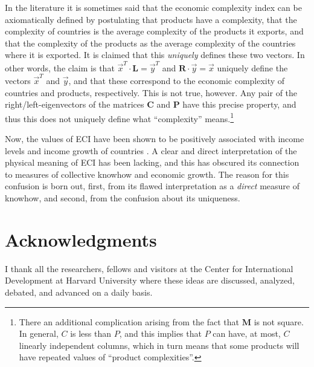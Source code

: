 \documentclass[12pt]{article}
\newcommand{\mtx}[1]{\mathbf{ #1}}
\begin{document}
In the literature it is sometimes said that the economic complexity index can be axiomatically defined by postulating that products have a complexity, that the complexity of countries is the average complexity of the products it exports, and that the complexity of the products as the average complexity of the countries where it is exported. It is claimed that this \emph{uniquely} defines these two vectors. In other words, the claim is that $\vec{x}^T\cdot\mtx{L}=\vec{y}^T$ and $\mtx{R}\cdot\vec{y}=\vec{x}$ uniquely define the vectors $\vec{x}^T$ and $\vec{y}$, and that these correspond to the economic complexity of countries and products, respectively. This is not true, however. Any pair of the right/left-eigenvectors of the matrices $\mtx{C}$ and $\mtx{P}$ have this precise property, and thus this does not uniquely define what ``complexity'' means.\footnote{There an additional complication arising from the fact that $\mtx{M}$ is not square. In general, $C$ is less than $P$, and this implies that $P$ can have, at most, $C$ linearly independent columns, which in turn means that some products will have repeated values of ``product complexities''.} 

Now, the values of ECI have been shown to be positively associated with income levels and income growth of countries \citep{HidalgoHausmann2009}. A clear and direct interpretation of the physical meaning of ECI has been lacking, and this has obscured its connection to measures of collective knowhow and economic growth. The reason for this confusion is born out, first, from its flawed interpretation as a \emph{direct} measure of knowhow, and second, from the confusion about its uniqueness.


\section*{Acknowledgments}
I thank all the researchers, fellows and visitors at the Center for International Development at Harvard University where these ideas are discussed, analyzed, debated, and advanced on a daily basis. %




\begin{footnotesize}

\end{footnotesize}
\end{document}
